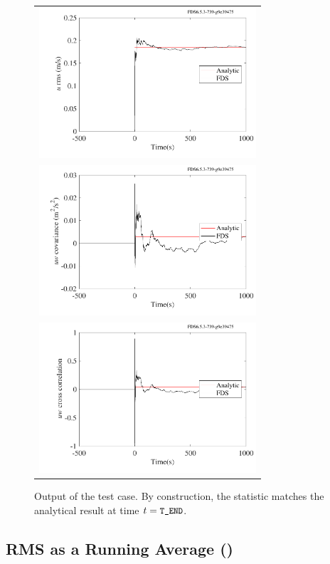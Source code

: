 \documentclass[11pt]{book}
\begin{document}
\begin{figure}[p]
\centering
\begin{tabular}{l}
\includegraphics[height=2.2in]{SCRIPT_FIGURES/rms_cov_corr_rms}\\
\includegraphics[height=2.2in]{SCRIPT_FIGURES/rms_cov_corr_cov} \\
\includegraphics[height=2.2in]{SCRIPT_FIGURES/rms_cov_corr_corr}
\end{tabular}
\caption[Sample case ]{Output of the  test case.  By construction, the statistic matches the analytical result at time $t = \mbox{\tt\small T\_END}$.}
\label{rms_cov_corr_plots}
\end{figure}

\FloatBarrier

\subsection{RMS as a Running Average (\texorpdfstring{}{rms\_example})}
\label{rms_example}
\end{document}
